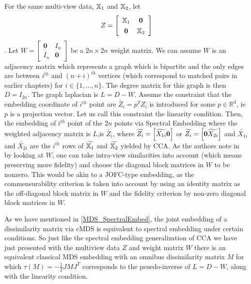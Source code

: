 \documentclass[12pt,oneside,final]{thesis}
\begin{document}
For the same multi-view data, $\mathbb{X}_1$ and $\mathbb{X}_2$,
let \[ Z= \left[
\begin{array}{cc}
                  \X_1 & \bm{0} \\
                \bm{0}   & \X_2 
                \end{array}
                \right]
                \].
                Let $W=\left[
                \begin{array}{cc}
                \bm{0} & I_n \\
                I_n   & \bm{0}
                \end{array}
                \right]$ be a $2n \times 2n$ weight matrix. We can assume $W$ is an adjacency matrix which represents a graph which is bipartite and the only  edges are between $i^{th}$ and $(n+i)^{th}$ vertices (which correspond to matched pairs in earlier chapters) for $i \in \{1,\ldots,n\}$. The degree matrix for this graph is then  $D=I_{2n}$. The graph laplacian is $L=D-W$. Assume the constraint that the embedding coordinate of $i^{th}$ point are $\widetilde{Z_i}=p^{T}Z_i$ is introduced for some $p \in \mathbb{R}^d$, ie $p$ is a projection vector. Let us call this constraint the linearity condition. Then, the embedding of $i^{th}$ point of the $2n$ points  via Spectral Embedding where the weighted adjacency matrix is $L$,is $\widetilde{Z_i}$, where $\widetilde{Z_i}= \left[ \widetilde{X_{1i}} \onespace \bm{0} \right]$ or  $\widetilde{Z_i}=\left[ \bm{0} \onespace \widetilde{X_{2i}} \right]$ and $\widetilde{X_{1i}}$ and $\widetilde{X_{2i}}$ are  the $i^{th}$ rows of $\widetilde{\mathbb{X}_1}$ and $\widetilde{\mathbb{X}_2}$ yielded by CCA.  As the authors note in \cite{CCAviaSpectralEmbed} by looking at $W$, one can take intra-view similarities into account (which means preserving more fidelity) and choose the diagonal block matrices in $W$ to be nonzero.
                This would be akin to a JOFC-type embedding, as the commensurability criterion is taken into account by using  an identity matrix as the  off-diagonal block matrix in $W$ and the fidelity criterion by non-zero diagonal block matrices in $W$.
                
             As we have mentioned in \ref{MDS_SpectralEmbed}, the joint embedding of a dissimilarity matrix  via cMDS  is equivalent to spectral embedding under certain conditions.
So just like the spectral embedding generalization of CCA  we have just presented with the multiview data $Z$ and weight matrix $W$ there is an equivalent classical MDS embedding with an omnibus dissimilarity matrix $M$ for which $\tau(M)=-\frac{1}{2}JMJ^T$  corresponds  to the  psuedo-inverse of  $L=D-W$, along with the linearity condition.
\end{document}
